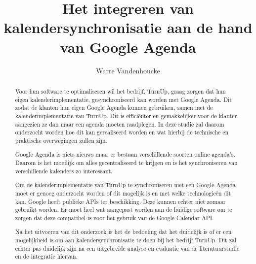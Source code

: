 \documentclass{hogent-article}
\title{Het integreren van kalendersynchronisatie aan de hand van Google Agenda}
\author{Warre Vandenhoucke}
\begin{document}
\begin{abstract}
  Voor hun software te optimaliseren wil het bedrijf, TurnUp, graag zorgen dat hun eigen kalenderimplementatie, gesynchroniseerd kan worden met Google Agenda. Dit zodat de klanten hun eigen Google Agenda kunnen gebruiken, samen met de kalenderimplementatie van TurnUp. 
  Dit is efficiënter en gemakkelijker voor de klanten aangezien ze dan maar een agenda moeten raadplegen. 
  In deze studie zal daarom onderzocht worden hoe dit kan gerealiseerd worden en wat hierbij de technische en praktische overwegingen zullen zijn. 
  
  Google Agenda is niets nieuws maar er bestaan verschillende soorten online agenda's. Daarom is het moeilijk om alles gecentraliseerd te krijgen en is het synchroniseren van verschillende kalenders zo interessant. 
  
  Om de kalenderimplementatie van TurnUp te synchroniseren met een Google Agenda moet er genoeg onderzocht worden of dit mogelijk is en met welke technologieën dit kan. 
  Google heeft publieke APIs ter beschikking. Deze kunnen echter niet zomaar gebruikt worden. Er moet heel wat aangepast worden aan de huidige software om te zorgen dat deze compatibel is voor het gebruik van de Google Calendar API. 
  
  Na het uitvoeren van dit onderzoek is het de bedoeling dat het duidelijk is of er een mogelijkheid is om aan kalendersynchronisatie te doen bij het bedrijf TurnUp.
  Dit zal echter pas duidelijk zijn na een uitgebreide analyse en evaluatie van de literatuurstudie en de integratie hiervan. 
\end{abstract}

\tableofcontents



\newpage

\printbibliography[heading=bibintoc]
\end{document}
